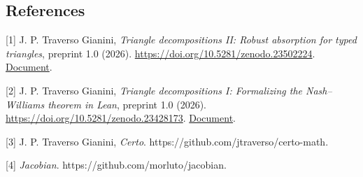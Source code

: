 \documentclass[english,11pt,a4paper]{article}
\begin{document}
\noindent\begin{minipage}{\linewidth}
\subsection{References}\label{references}

\begingroup\small\raggedright
\setlength{\parskip}{3pt}

{[}1{]} J. P. Traverso Gianini, \emph{Triangle decompositions II: Robust absorption for typed triangles}, preprint 1.0 (2026). \url{https://doi.org/10.5281/zenodo.23502224}. \href{https://github.com/jtraverso/nash-williams-triangle-decompositions-release/blob/main/preprints/PAPER_II/01_manuscript/PAPER_II_preprint_v1.0_en.md}{Document}.

{[}2{]} J. P. Traverso Gianini, \emph{Triangle decompositions I: Formalizing the Nash--Williams theorem in Lean}, preprint 1.0 (2026). \url{https://doi.org/10.5281/zenodo.23428173}. \href{https://github.com/jtraverso/nash-williams-triangle-decompositions-release/blob/main/preprints/PAPER_I/01_manuscript/PAPER_I_preprint_v1.0_en.md}{Document}.

{[}3{]} J. P. Traverso Gianini, \emph{Certo}. https://github.com/jtraverso/certo-math.

{[}4{]} \emph{Jacobian}. https://github.com/morluto/jacobian.

\endgroup

\end{minipage}
\end{document}
